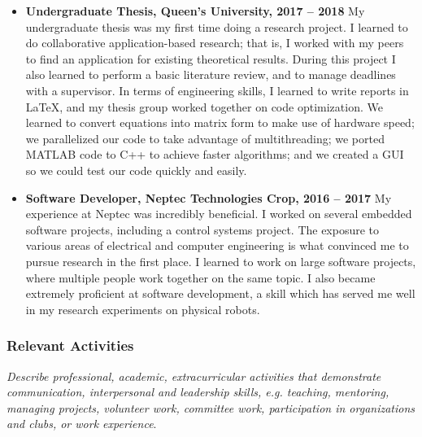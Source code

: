 \documentclass[a4paper,12pt]{article}
\begin{document}
\begin{itemize}
    \item \textbf{Undergraduate Thesis, Queen's University, 2017 -- 2018}
        My undergraduate thesis was my first time doing a research project.
        I learned to do collaborative application-based research; that is, I
        worked with my peers to find an application for existing theoretical
        results. During this project I also learned to perform a basic
        literature review, and to manage deadlines with a supervisor.
        In terms of engineering skills, I learned to write reports in LaTeX,
        and my thesis group worked together on code optimization. We learned to
        convert equations into matrix form to make use of hardware speed; we
        parallelized our code to take advantage of multithreading; we ported
        MATLAB code to C++ to achieve faster algorithms; and we created a GUI so
        we could test our code quickly and easily.

    \item \textbf{Software Developer, Neptec Technologies Crop, 2016 -- 2017}
        My experience at Neptec was incredibly beneficial.
        I worked on several embedded software projects, including a control
        systems project. The exposure to various areas of electrical and
        computer engineering is what convinced me to pursue research in the
        first place.
        I learned to work on large software projects, where multiple people work
        together on the same topic.
        I also became extremely proficient at software development, a skill
        which has served me well in my research experiments on physical robots.
        
\end{itemize}

\subsubsection*{Relevant Activities}
\textit{Describe professional, academic, extracurricular activities that
    demonstrate communication, interpersonal and leadership skills, e.g.
    teaching, mentoring, managing projects, volunteer work, committee work,
participation in organizations and clubs, or work experience}.
\end{document}
